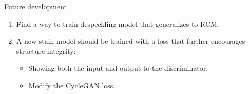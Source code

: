 \documentclass[t]{beamer}
\begin{document}
\begin{frame}{Future development}
\begin{enumerate}
\item Find a way to train despeckling model that generalizes to RCM.
\item A new stain model
should be trained with a loss that further encourages structure integrity:
\begin{itemize}
\item Showing both the input and output to the discriminator.
\item Modify the CycleGAN loss.
\end{itemize}
\end{enumerate}
\end{frame}
\end{document}
